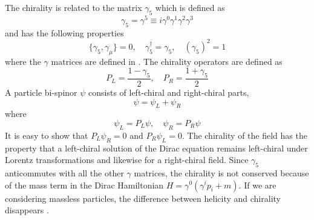 \documentclass[12pt]{report}
\begin{document}
The chirality is related to the matrix $\gamma_{5}$ which is defined as
\begin{equation}
\gamma_{5} = \gamma^{5} \equiv i \gamma^{0} \gamma^{1} \gamma^{2} \gamma^{3}
\end{equation}
and has the following properties
\begin{equation}
\{ \gamma_{5}, \gamma_{\mu} \} = 0, \quad 
\gamma_{5}^{\dagger} = \gamma_{5}, \quad 
(\gamma_{5})^{2} = 1
\end{equation}
where the $\gamma$ matrices are defined in \cite{peskin_qft}.
The chirality operators are defined as
\begin{equation}
P_{L} = \frac{1 - \gamma_{5}}{2}, \quad 
P_{R} = \frac{1 + \gamma_{5}}{2}
\end{equation}
A particle bi-spinor $\psi$ consists of left-chiral and right-chiral parts,
\begin{equation}
\psi = \psi_{L} + \psi_{R}
\end{equation}
where
\begin{equation}
\psi_{L} = P_{L} \psi, \quad 
\psi_{R} = P_{R} \psi
\end{equation}
It is easy to show that $P_{L} \psi_{R} = 0$ and $P_{R} \psi_{L} = 0$.
The chirality of the field has the property that a left-chiral solution of the Dirac equation remains left-chiral under Lorentz transformations and likewise for a right-chiral field.
Since $\gamma_{5}$ anticommutes with all the other $\gamma$ matrices, the chirality is not conserved because of the mass term in the Dirac Hamiltonian $H = \gamma^{0} (\gamma^{i} p_{i} + m)$.
If we are considering massless particles, the difference between helicity and chirality disappears  \cite{arXiv:1006.1718v2}.
\end{document}
